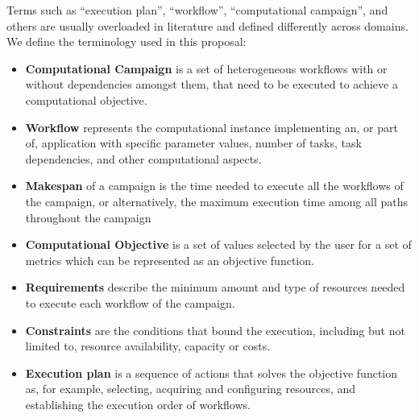 \label{definitions}
Terms such as ``execution plan'', ``workflow'', ``computational campaign'', and others are usually overloaded in literature and defined differently across domains. We define the terminology used in this proposal:
\begin{itemize}
    \item \textbf{Computational Campaign} is a set of heterogeneous workflows with or without dependencies amongst them, that need to be executed to achieve a computational objective.
    \item \textbf{Workflow} represents the computational instance implementing an, or part of, application with specific parameter values, number of tasks, task dependencies, and other computational aspects.
    \item \textbf{Makespan} of a campaign is the time needed to execute all the workflows of the campaign, or alternatively, the maximum execution time among all paths throughout the campaign~\cite{chirkin2017execution}
    \item \textbf{Computational Objective} is a set of values selected by the user for a set of metrics which can be represented as an objective function.
    \item \textbf{Requirements} describe the minimum amount and type of resources needed to execute  each workflow of the campaign.
    \item \textbf{Constraints} are the conditions that bound the execution, including but not limited to, resource availability, capacity or costs.
    \item \textbf{Execution plan} is a sequence of actions that solves the objective function as, for example, selecting, acquiring and configuring resources, and establishing the execution order of workflows.
\end{itemize}

